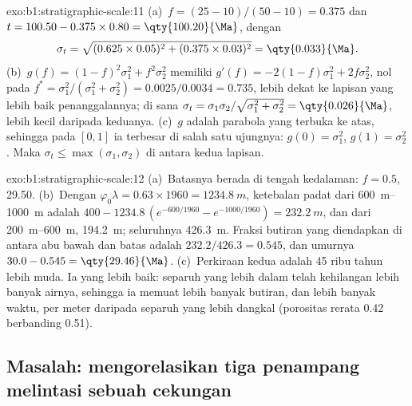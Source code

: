 \begin{solution}{exo:b1:stratigraphic-scale:11}
(a)~$f = (25 - 10)/(50 - 10) = 0.375$ dan $t = 100.50 - 0.375 \times 0.80 =
\qty{100.20}{\Ma}$, dengan
\[
  \sigma_t = \sqrt{(0.625 \times 0.05)^2 + (0.375 \times 0.03)^2} = \qty{0.033}{\Ma}.
\] (b)~$g(f) = (1 - f)^2\sigma_1^2 + f^2\sigma_2^2$
memiliki $g'(f) = -2(1 - f)\sigma_1^2 + 2f\sigma_2^2$, nol pada $f^* =
\sigma_1^2/(\sigma_1^2 + \sigma_2^2) = 0.0025/0.0034 = 0.735$, lebih dekat ke lapisan
yang lebih baik penanggalannya; di sana $\sigma_t = \sigma_1\sigma_2/\sqrt{\sigma_1^2 + \sigma_2^2} =
\qty{0.026}{\Ma}$, lebih kecil daripada keduanya. (c)~$g$ adalah parabola yang terbuka
ke atas, sehingga pada $[0, 1]$ ia terbesar di salah satu ujungnya: $g(0) = \sigma_1^2$,
$g(1) = \sigma_2^2$. Maka $\sigma_t \le \max(\sigma_1, \sigma_2)$ di antara kedua lapisan.
\end{solution}

\begin{solution}{exo:b1:stratigraphic-scale:12}
(a)~Batasnya berada di tengah kedalaman: $f = 0.5$, \qty{29.50}{\Ma}. (b)~Dengan
$\varphi_0\lambda = 0.63 \times 1960 = \qty{1234.8}{m}$, ketebalan padat dari
\qtyrange{600}{1000}{m} adalah $400 - 1234.8\,(e^{-600/1960} - e^{-1000/1960}) =
\qty{232.2}{m}$, dan dari \qtyrange{200}{600}{m}, \qty{194.2}{m}; seluruhnya
\qty{426.3}{m}. Fraksi butiran yang diendapkan di antara abu bawah dan batas adalah
$232.2/426.3 = 0.545$, dan umurnya $30.0 - 0.545 =
\qty{29.46}{\Ma}$. (c)~Perkiraan kedua adalah \num{45} ribu tahun lebih muda.
Ia yang lebih baik: separuh yang lebih dalam telah kehilangan lebih banyak airnya, sehingga
ia memuat lebih banyak butiran, dan lebih banyak waktu, per meter daripada separuh yang
lebih dangkal (porositas rerata \num{0.42} berbanding \num{0.51}).
\end{solution}

\subsection*{Masalah: mengorelasikan tiga penampang melintasi sebuah cekungan}

